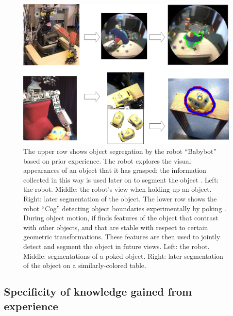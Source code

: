 \begin{figure}[t]

\centerline{
\includegraphics[width=0.75\columnwidth]{fig-robots}
}

\caption[Exploitation of key moments in robotics]{
%
\ifcapped
%
The upper row shows object segregation by the robot ``Babybot'' 
based on prior experience.  
%
The robot explores the visual appearances of an object that
it has grasped; the information collected in this way is used later on to
segment the object \cite{natale05exploring}. 
%
%
Left: the robot.
Middle: the robot's view when holding up an object.
Right: later segmentation of the object.
%
%
The lower row shows the robot ``Cog''
detecting object boundaries experimentally by
poking \cite{fitzpatrick03object}.
%
During object motion, if finds features of the object that contrast with other
objects, and that are stable with respect to certain geometric
transformations.  These features are then used to jointly detect
and segment the object in future views.  Left: the robot.
Middle: segmentations of a poked object.
Right: later segmentation of the object on a
similarly-colored table. 
%
%
\fi
%
}

\label{fig:robot}

\end{figure}





\subsection{Specificity of knowledge gained from experience}


